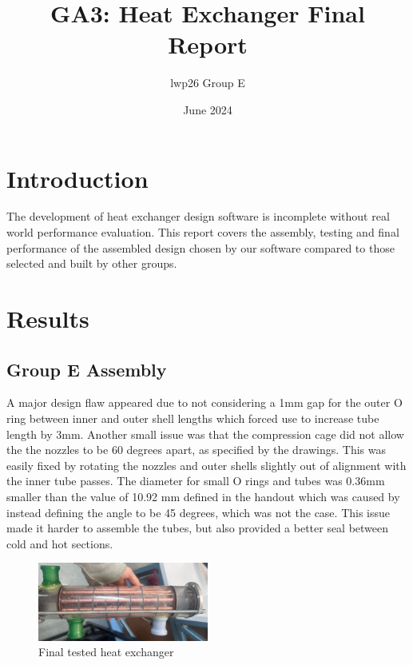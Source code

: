 \documentclass{article}
\begin{document}
\title{GA3: Heat Exchanger Final Report}
\author{lwp26 Group E}
\date{June 2024}
\maketitle 


\section{Introduction}

The development of heat exchanger design software is incomplete without real world performance evaluation.
This report covers the assembly, testing and final performance of the assembled design chosen by our software compared to those selected and built by other groups.

\section{Results}

\subsection{Group E Assembly}
A major design flaw appeared due to not considering a 1mm gap for the outer O ring between inner and outer shell lengths which forced use to increase tube length by 3mm.
Another small issue was that the compression cage did not allow the the nozzles to be 60 degrees apart, as specified by the drawings. This was easily fixed by rotating the nozzles and outer shells slightly
out of alignment with the inner tube passes.
The diameter for small O rings and tubes was 0.36mm smaller than the value of 10.92 mm defined in the handout which was caused by instead defining the angle to be 45 degrees, which was not the case.
This issue made it harder to assemble the tubes, but also provided a better seal between cold and hot sections.

\begin{figure}[H]
    \centering
    \includegraphics[width=0.5\textwidth]{final_tested.jpg}
    \caption{Final tested heat exchanger}
    \label{fig:heat_exchanger}
\end{figure}
\end{document}
